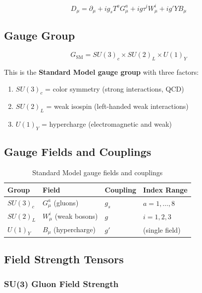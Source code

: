 \begin{equation}
\label{eq:canonical:sm_covariant}
D_\mu = \partial_\mu + ig_s T^a G^a_\mu + ig \tau^i W^i_\mu + ig' Y B_\mu
\end{equation}

\subsection{Gauge Group}

\begin{equation}
\label{eq:canonical:sm_group}
\boxed{G_{\text{SM}} = SU(3)_c \times SU(2)_L \times U(1)_Y}
\end{equation}

This is the \textbf{Standard Model gauge group} with three factors:

\begin{enumerate}
    \item $SU(3)_c$ = color symmetry (strong interactions, QCD)
    \item $SU(2)_L$ = weak isospin (left-handed weak interactions)
    \item $U(1)_Y$ = hypercharge (electromagnetic and weak)
\end{enumerate}

\subsection{Gauge Fields and Couplings}

\begin{table}[h]
\centering
\begin{tabular}{|l|l|l|l|}
\hline
\textbf{Group} & \textbf{Field} & \textbf{Coupling} & \textbf{Index Range} \\
\hline
$SU(3)_c$ & $G^a_\mu$ (gluons) & $g_s$ & $a = 1, \ldots, 8$ \\
$SU(2)_L$ & $W^i_\mu$ (weak bosons) & $g$ & $i = 1, 2, 3$ \\
$U(1)_Y$ & $B_\mu$ (hypercharge) & $g'$ & (single field) \\
\hline
\end{tabular}
\caption{Standard Model gauge fields and couplings}
\label{tab:canonical:sm_fields}
\end{table}

\subsection{Field Strength Tensors}

\subsubsection{SU(3) Gluon Field Strength}


